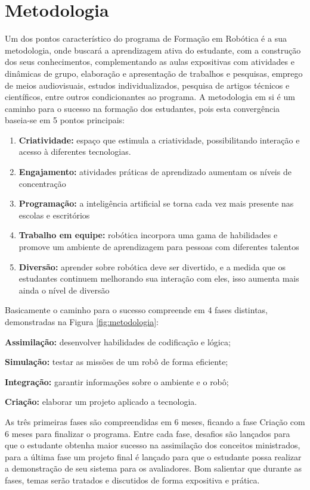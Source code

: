 \chapter{Metodologia}
\label{chap:mat}

Um dos pontos característico do programa de Formação em Robótica é a sua metodologia, onde buscará a aprendizagem ativa do estudante, com a construção dos seus conhecimentos, complementando as aulas expositivas com atividades e dinâmicas de grupo, elaboração e apresentação de trabalhos e pesquisas, emprego de meios audiovisuais, estudos individualizados, pesquisa de artigos técnicos e científicos, entre outros condicionantes ao programa.
A metodologia em si é um caminho para o sucesso na formação dos estudantes, pois esta convergência baseia-se em 5 pontos principais:

\begin{enumerate}
    \item \textbf{Criatividade:} espaço que estimula a criatividade, possibilitando interação e acesso à diferentes tecnologias.
    \item \textbf{Engajamento:} atividades práticas de aprendizado aumentam os níveis de concentração
    \item \textbf{Programação:} a inteligência artificial se torna cada vez mais presente nas escolas e escritórios
    \item \textbf{Trabalho em equipe:} robótica incorpora uma gama de habilidades e promove um ambiente de aprendizagem para pessoas com diferentes talentos
    \item \textbf{Diversão:} aprender sobre robótica deve ser divertido, e a medida que os estudantes continuem melhorando sua interação com eles, isso aumenta mais ainda o nível de diversão
\end{enumerate}


Basicamente o caminho para o sucesso compreende em 4 fases distintas, demonstradas na Figura \ref{fig:metodologia}:

\textbf{Assimilação:} desenvolver habilidades de codificação e lógica;

\textbf{Simulação:} testar as missões de um robô de forma eficiente;

\textbf{Integração:} garantir informações sobre o ambiente e o robô;

\textbf{Criação:} elaborar um projeto aplicado a tecnologia.

As três primeiras fases são compreendidas em 6 meses, ficando a fase Criação com 6 meses para finalizar o programa.
Entre cada fase, desafios são lançados para que o estudante obtenha maior sucesso na assimilação dos conceitos ministrados, para a última fase um projeto final é lançado para que o estudante possa realizar a demonstração de seu sistema para os avaliadores.
Bom salientar que durante as fases, temas serão tratados e discutidos de forma expositiva e prática.


